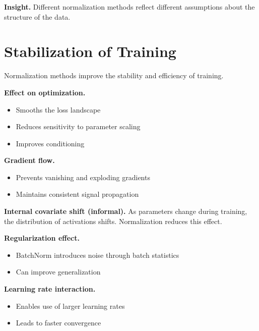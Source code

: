 \medskip

\noindent
\textbf{Insight.}  
Different normalization methods reflect different assumptions about the structure of the data.

\section{Stabilization of Training}

Normalization methods improve the stability and efficiency of training.

\medskip

\noindent
\textbf{Effect on optimization.}
\begin{itemize}
    \item Smooths the loss landscape
    \item Reduces sensitivity to parameter scaling
    \item Improves conditioning
\end{itemize}

\medskip

\noindent
\textbf{Gradient flow.}
\begin{itemize}
    \item Prevents vanishing and exploding gradients
    \item Maintains consistent signal propagation
\end{itemize}

\medskip

\noindent
\textbf{Internal covariate shift (informal).}  
As parameters change during training, the distribution of activations shifts. Normalization reduces this effect.

\medskip

\noindent
\textbf{Regularization effect.}
\begin{itemize}
    \item BatchNorm introduces noise through batch statistics
    \item Can improve generalization
\end{itemize}

\medskip

\noindent
\textbf{Learning rate interaction.}
\begin{itemize}
    \item Enables use of larger learning rates
    \item Leads to faster convergence
\end{itemize}

\medskip

